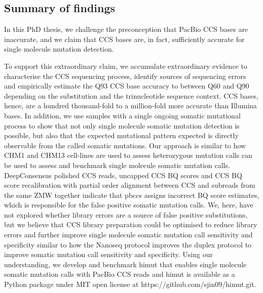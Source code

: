 \subsection{Summary of findings}

In this PhD thesis, we challenge the preconception that PacBio CCS bases are inaccurate, and we claim that CCS bases are, in fact, sufficiently accurate for single molecule mutation detection. 

To support this extraordinary claim, we accumulate extraordinary evidence to characterise the CCS sequencing process, identify sources of sequencing errors and empirically estimate the Q93 CCS base accuracy to between Q60 and Q90 depending on the substitution and the trinucleotide sequence context. CCS bases, hence, are a hundred thousand-fold to a million-fold more accurate than Illumina bases. In addition, we use samples with a single ongoing somatic mutational process to show that not only single molecule somatic mutation detection is possible, but also that the expected mutational pattern expected is directly observable from the called somatic mutations. Our approach is similar to how CHM1 and CHM13 cell-lines are used to assess heterozygous mutation calls can be used to assess and benchmark single molecule somatic mutation calls. DeepConsensus polished CCS reads, uncapped CCS BQ scores and CCS BQ score recalibration with partial order alignment between CCS and subreads from the same ZMW together indicate that pbccs assigns incorrect BQ score estimates, which is responsible for the false positive somatic mutation calls. We, here, have not explored whether library errors are a source of false positive substitutions, but we believe that CCS library preparation could be optimised to reduce library errors and further improve single molecule somatic mutation call sensitivity and specificity similar to how the Nanoseq protocol improves the duplex protocol to improve somatic mutation call sensitivity and specificity. Using our understanding, we develop and benchmark himut that enables single molecule somatic mutation calls with PacBio CCS reads and himut is available as a Python package under MIT open license at https://github.com/sjin09/himut.git.

